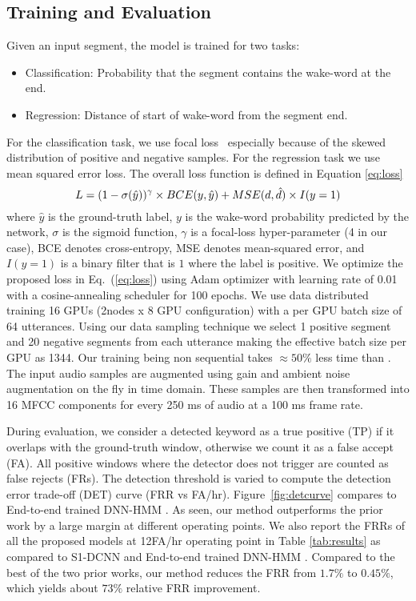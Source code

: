 \subsection{Training and Evaluation}
Given an input segment, the model is trained for two tasks:
\begin{itemize}
    \item Classification: Probability that the segment contains the wake-word at the end.
    \item Regression: Distance of start of wake-word from the segment end.
\end{itemize}
For the classification task, we use focal loss~\cite{lin2017focal} especially because of the skewed distribution of positive and negative samples. For the regression task we use mean squared error loss. The overall loss function is defined in Equation \ref{eq:loss}
\begin{equation}
    \label{eq:loss}
    L=(1-\sigma(\hat{y}))^{\gamma}\times BCE(y,\hat{y}) \\
    + MSE(d,\hat{d})\times I(y=1)
\end{equation}
where $\hat{y}$ is the ground-truth label, $y$ is the wake-word probability predicted by the network, $\sigma$ is the sigmoid function, $\gamma$ is a focal-loss hyper-parameter (4 in our case), BCE denotes cross-entropy, MSE denotes mean-squared error, and $I(y=1)$ is a binary filter that is $1$ where the label is positive. We optimize the proposed loss in Eq.~(\ref{eq:loss}) using Adam optimizer \cite{kingma2014adam} with learning rate of 0.01 with a cosine-annealing scheduler for 100 epochs. We use data distributed training 16 GPUs (2nodes x 8 GPU configuration) with a per GPU batch size of 64 utterances. Using our data sampling technique we select 1 positive  segment and 20 negative segments from each utterance making the effective batch size per GPU as 1344. Our training being non sequential takes $\approx 50\%$ less time than \cite{shrivastava2021optimize}. The input audio samples are augmented using gain and ambient noise augmentation on the fly in time domain. These samples are then transformed into 16 MFCC components for every 250 ms of audio at a 100 ms frame rate.

During evaluation, we consider a detected keyword as a true positive (TP) if it overlaps with the ground-truth window, otherwise we count it as a false accept (FA). All positive windows where the detector does not trigger are counted as false rejects (FRs). The detection threshold is varied to compute the detection error trade-off (DET) curve (FRR vs FA/hr). Figure~\ref{fig:detcurve} compares \prjname to End-to-end trained DNN-HMM \cite{shrivastava2021optimize}. As seen, our method outperforms the prior work by a large margin at different operating points. We also report the FRRs of all the proposed models at 12FA/hr operating point in Table \ref{tab:results} as compared to S1-DCNN \cite{higuchi2020stacked} and End-to-end trained DNN-HMM \cite{shrivastava2021optimize}. Compared to the best of the two prior works, our method reduces the FRR from $1.7\%$ to $0.45\%$, which yields about $73\%$ relative FRR improvement.

